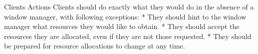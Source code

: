 %
%

\secc Clients Actions
Clients should do exactly what they would do in the absence of a window manager, with following exceptions:
\begitems
* They should hint to the window manager what resources they would like to obtain.
* They should accept the resources they are allocated, even if they are not those requested.
* They should be prepared for resource allocations to change at any time.
\enditems

